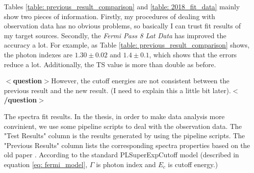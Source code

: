 \documentclass[12pt]{report}
\newcommand{\mycaption}[1]{\protect \caption{#1}}
\newcommand{\question}[1]{
  $<$\textbf{question}$>$#1$<$\textbf{/question}$>$
}
\begin{document}
          Tables \ref{table: previous_result_comparison} and \ref{table: 2018_fit_data} mainly 
          show two pieces of information. Firstly, my procedures of dealing with observation 
          data has no obvious problems, so basically I can trust fit results of my target 
          sources. Secondly, the \textit{Fermi Pass 8 Lat Data} has improved the accuracy a 
          lot. For example, as Table \ref{table: previous_result_comparison} shows, the photon 
          indexes are $1.30\pm0.02$ and $1.4\pm0.1$, which shows that the errors reduce a lot. 
          Additionally, the TS value is more than double as before.
          \question{However, the cutoff energies are not consistent between the previous result and the new result.
            (I need to explain this a little bit later).}
          \vspace{1cm} 
          \begin{table}[!ht]
            \centering
            \vspace{0.5cm}
              \centering
              \mycaption{The spectra fit results. In the thesis, in order to make data 
                analysis more convinient, we use some pipeline scripts to deal with the 
                observation data. The "Test Results" column is the results generated by 
                using the pipeline scripts. The "Previous Results" column lists the 
                corresponding spectra properties based on the old paper 
                \cite{0067-0049-208-2-17}. According to the standard PLSuperExpCutoff model 
                (described in equation \ref{eq: fermi_model}, $\Gamma$ is photon index 
                and $E_c$ is cutoff energy.)}
              \label{table: previous_result_comparison}
          \end{table}
          \vspace{1cm}            
\end{document}
